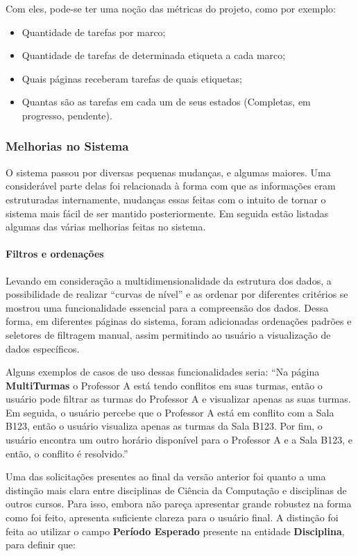 Com eles, pode-se ter uma noção das métricas do projeto, como por exemplo:

\begin{itemize}
  \item Quantidade de tarefas por marco;
  \item Quantidade de tarefas de determinada etiqueta a cada marco;
  \item Quais páginas receberam tarefas de quais etiquetas;
  \item Quantas são as tarefas em cada um de seus estados (Completas, em progresso, pendente).
\end{itemize}

\subsubsection{Melhorias no Sistema}

O sistema passou por diversas pequenas mudanças, e algumas maiores. Uma considerável parte delas foi relacionada à forma com que as informações eram estruturadas internamente, mudanças essas feitas com o intuito de tornar o sistema mais fácil de ser mantido posteriormente. Em seguida estão listadas algumas das várias melhorias feitas no sistema.

\paragraph*{Filtros e ordenações}

Levando em consideração a multidimensionalidade da estrutura dos dados, a possibilidade de realizar ``curvas de nível'' e as ordenar por diferentes critérios se mostrou uma funcionalidade essencial para a compreensão dos dados. Dessa forma, em diferentes páginas do sistema, foram adicionadas ordenações padrões e seletores de filtragem manual, assim permitindo ao usuário a visualização de dados específicos.

Alguns exemplos de casos de uso dessas funcionalidades seria: ``Na página \textbf{MultiTurmas} o Professor A está tendo conflitos em suas turmas, então o usuário pode filtrar as turmas do Professor A e visualizar apenas as suas turmas. Em seguida, o usuário percebe que o Professor A está em conflito com a Sala B123, então o usuário visualiza apenas as turmas da Sala B123. Por fim, o usuário encontra um outro horário disponível para o Professor A e a Sala B123, e então, o conflito é resolvido.''

Uma das solicitações presentes ao final da versão anterior foi quanto a uma distinção mais clara entre disciplinas de Ciência da Computação e disciplinas de outros cursos. Para isso, embora não pareça apresentar grande robustez na forma como foi feito, apresenta suficiente clareza para o usuário final. A distinção foi feita ao utilizar o campo \textbf{Período Esperado} presente na entidade \textbf{Disciplina}, para definir que:

